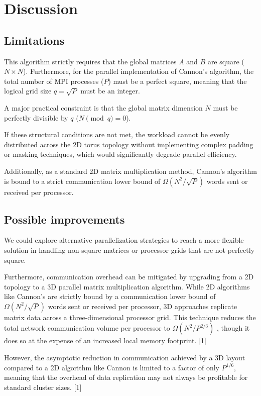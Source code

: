 \documentclass[
  12pt,
]{article}
\begin{document}
\section{Discussion}\label{discussion}

\subsection{Limitations}\label{limitations}

This algorithm strictly requires that the global matrices \(A\) and
\(B\) are square (\(N \times N\)). Furthermore, for the parallel
implementation of Cannon's algorithm, the total number of MPI processes
(\(P\)) must be a perfect square, meaning that the logical grid size
\(q = \sqrt{P}\) must be an integer.

A major practical constraint is that the global matrix dimension \(N\)
must be perfectly divisible by \(q\) (\(N \pmod q = 0\)).

If these structural conditions are not met, the workload cannot be
evenly distributed across the 2D torus topology without implementing
complex padding or masking techniques, which would significantly degrade
parallel efficiency.

Additionally, as a standard 2D matrix multiplication method, Cannon's
algorithm is bound to a strict communication lower bound of
\(\Omega(N^2 / \sqrt{P})\) words sent or received per processor.

\subsection{Possible improvements}\label{possible-improvements}

We could explore alternative parallelization strategies to reach a more
flexible solution in handling non-square matrices or processor grids
that are not perfectly square.

Furthermore, communication overhead can be mitigated by upgrading from a
2D topology to a 3D parallel matrix multiplication algorithm. While 2D
algorithms like Cannon's are strictly bound by a communication lower
bound of \(\Omega(N^2 / \sqrt{P})\) words sent or received per
processor, 3D approaches replicate matrix data across a
three-dimensional processor grid. This technique reduces the total
network communication volume per processor to \(\Omega(N^2 / P^{2/3})\)
, though it does so at the expense of an increased local memory
footprint. {[}1{]}

However, the asymptotic reduction in communication achieved by a 3D
layout compared to a 2D algorithm like Cannon is limited to a factor of
only \(P^{1/6}\), meaning that the overhead of data replication may not
always be profitable for standard cluster sizes. {[}1{]}
\end{document}
